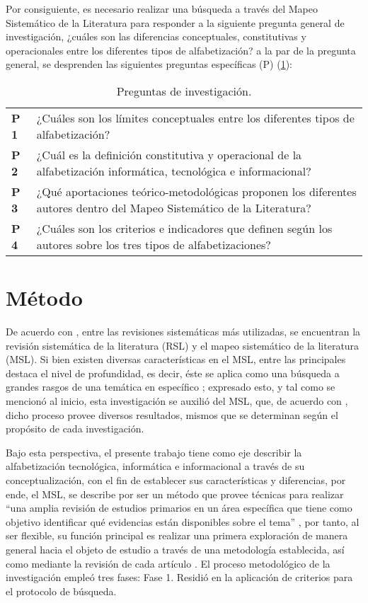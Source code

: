\documentclass[spanish]{textolivre}
\begin{document}
Por consiguiente, es necesario realizar una búsqueda a través del Mapeo Sistemático de la Literatura para responder a la siguiente pregunta general de investigación, ¿cuáles son las diferencias conceptuales, constitutivas y operacionales entre los diferentes tipos de alfabetización? a la par de la pregunta general, se desprenden las siguientes preguntas específicas (P) (\cref{tbl03}):

\begin{table}[htbp]
\caption{Preguntas de investigación.}
\label{tbl03}
\centering
\begin{tabular}{lp{12cm}}
\toprule
\textbf{P 1} & ¿Cuáles son los límites conceptuales entre los diferentes tipos de alfabetización? \\ 
\textbf{P 2} & ¿Cuál es la definición constitutiva y operacional de la alfabetización informática, tecnológica e informacional? \\ 
\textbf{P 3} & ¿Qué aportaciones teórico-metodológicas proponen los diferentes autores dentro del Mapeo Sistemático de la Literatura? \\ 
\textbf{P 4} & ¿Cuáles son los criterios e indicadores que definen según los autores sobre los tres tipos de alfabetizaciones? \\
\bottomrule
\end{tabular}
\end{table}

\section{Método}\label{sec-metodo}
De acuerdo con \textcite{garcia-penalvo_revisiones_2019}, entre las revisiones sistemáticas más utilizadas, se encuentran la revisión sistemática de la literatura (RSL) y el mapeo sistemático de la literatura (MSL). Si bien existen diversas características en el MSL, entre las principales destaca el nivel de profundidad, es decir, éste se aplica como una búsqueda a grandes rasgos de una temática en específico \cite{cascade_project_mapping_2012}; expresado esto, y tal como se mencionó al inicio, esta investigación se auxilió del MSL, que, de acuerdo con \textcite{garcia-holgado_tecnicas_2018}, dicho proceso provee diversos resultados, mismos que se determinan según el propósito de cada investigación.

Bajo esta perspectiva, el presente trabajo tiene como eje describir la alfabetización tecnológica, informática e informacional a través de su conceptualización, con el fin de establecer sus características y diferencias, por ende, el MSL, se describe por ser un método que provee técnicas para realizar “una amplia revisión de estudios primarios en un área específica que tiene como objetivo identificar qué evidencias están disponibles sobre el tema” \cite[s.p.]{garcia-penalvo_revisiones_2019}, por tanto, al ser flexible, su función principal es realizar una primera exploración de manera general hacia el objeto de estudio a través de una metodología establecida, así como mediante la revisión de cada artículo \cite{cruz-benito__systematic_2016}.
El proceso metodológico de la investigación empleó tres fases:
Fase 1. Residió en la aplicación de criterios para el protocolo de búsqueda.
\end{document}
